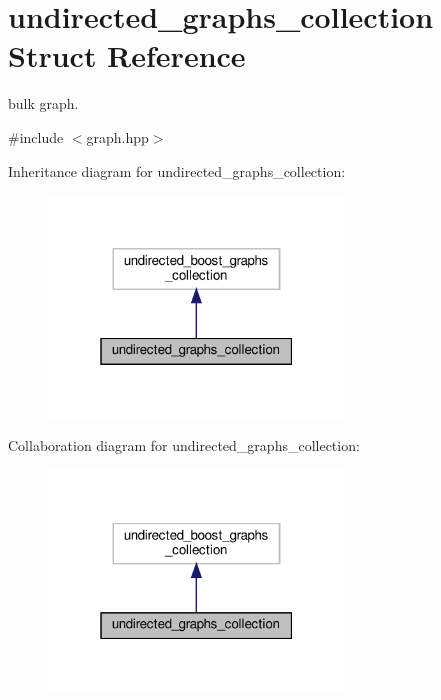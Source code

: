 \hypertarget{structundirected__graphs__collection}{}\section{undirected\+\_\+graphs\+\_\+collection Struct Reference}
\label{structundirected__graphs__collection}


bulk graph.  




{\ttfamily \#include $<$graph.\+hpp$>$}



Inheritance diagram for undirected\+\_\+graphs\+\_\+collection\+:
\nopagebreak
\begin{figure}[H]
\begin{center}
\leavevmode
\includegraphics[width=223pt]{d5/dc5/structundirected__graphs__collection__inherit__graph}
\end{center}
\end{figure}


Collaboration diagram for undirected\+\_\+graphs\+\_\+collection\+:
\nopagebreak
\begin{figure}[H]
\begin{center}
\leavevmode
\includegraphics[width=223pt]{d2/d93/structundirected__graphs__collection__coll__graph}
\end{center}
\end{figure}
